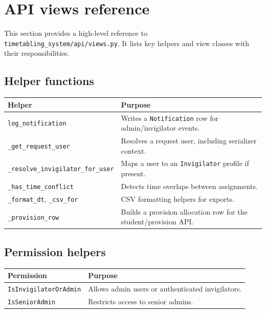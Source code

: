\section{API views reference}
\label{sec:api:views}

This section provides a high-level reference to \texttt{timetabling\_system/api/views.py}. It lists key helpers and view classes with their responsibilities.

\subsection{Helper functions}
\label{subsec:api:views:helpers}

\begin{longtable}{p{}p{}}
\toprule
\textbf{Helper} & \textbf{Purpose} \\
\midrule
\texttt{log\_notification} & Writes a \texttt{Notification} row for admin/invigilator events. \\
\texttt{\_get\_request\_user} & Resolves a request user, including serializer context. \\
\texttt{\_resolve\_invigilator\_for\_user} & Maps a user to an \texttt{Invigilator} profile if present. \\
\texttt{\_has\_time\_conflict} & Detects time overlaps between assignments. \\
\texttt{\_format\_dt}, \texttt{\_csv\_for} & CSV formatting helpers for exports. \\
\texttt{\_provision\_row} & Builds a provision allocation row for the student/provision API. \\
\bottomrule
\end{longtable}

\subsection{Permission helpers}
\label{subsec:api:views:permissions}

\begin{longtable}{p{}p{}}
\toprule
\textbf{Permission} & \textbf{Purpose} \\
\midrule
\texttt{IsInvigilatorOrAdmin} & Allows admin users or authenticated invigilators. \\
\texttt{IsSeniorAdmin} & Restricts access to senior admins. \\
\bottomrule
\end{longtable}

